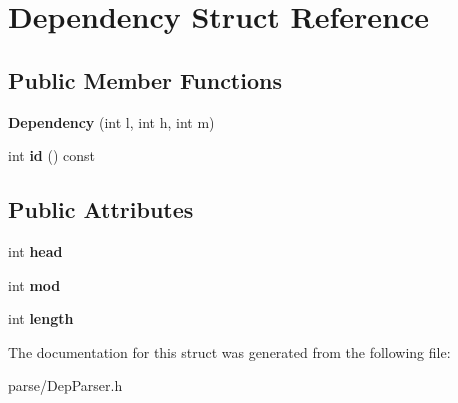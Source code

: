 \hypertarget{struct_dependency}{
\section{Dependency Struct Reference}
\label{struct_dependency}
}
\subsection*{Public Member Functions}
\begin{DoxyCompactItemize}
\item 
\hypertarget{struct_dependency_a92ebdf715c4c81e556bc274f86027400}{
{\bfseries Dependency} (int l, int h, int m)}
\label{struct_dependency_a92ebdf715c4c81e556bc274f86027400}

\item 
\hypertarget{struct_dependency_a38ba361a116c72f4e41298b6320a6540}{
int {\bfseries id} () const }
\label{struct_dependency_a38ba361a116c72f4e41298b6320a6540}

\end{DoxyCompactItemize}
\subsection*{Public Attributes}
\begin{DoxyCompactItemize}
\item 
\hypertarget{struct_dependency_ae50c91ea1c7f2a16a29e7ecf9cf0a6ba}{
int {\bfseries head}}
\label{struct_dependency_ae50c91ea1c7f2a16a29e7ecf9cf0a6ba}

\item 
\hypertarget{struct_dependency_a45e806cfc00a3bcce4d5ebaab52c1f77}{
int {\bfseries mod}}
\label{struct_dependency_a45e806cfc00a3bcce4d5ebaab52c1f77}

\item 
\hypertarget{struct_dependency_a95f049533781d9ae8fea8f447e4739fe}{
int {\bfseries length}}
\label{struct_dependency_a95f049533781d9ae8fea8f447e4739fe}

\end{DoxyCompactItemize}


The documentation for this struct was generated from the following file:\begin{DoxyCompactItemize}
\item 
parse/DepParser.h\end{DoxyCompactItemize}
